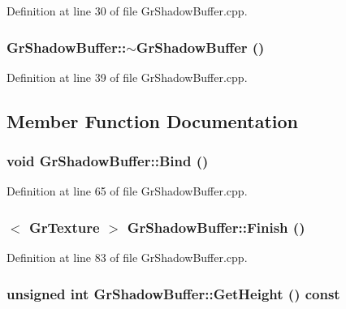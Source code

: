 Definition at line 30 of file GrShadowBuffer.cpp.\hypertarget{class_gr_shadow_buffer_21c7a7e89872ff5d1f3d475d4259c370}{
\subsubsection[{$\sim$GrShadowBuffer}]{\setlength{\rightskip}{0pt plus 5cm}GrShadowBuffer::$\sim$GrShadowBuffer ()}}
\label{class_gr_shadow_buffer_21c7a7e89872ff5d1f3d475d4259c370}




Definition at line 39 of file GrShadowBuffer.cpp.

\subsection{Member Function Documentation}
\hypertarget{class_gr_shadow_buffer_ac80386a135c833c980497559936e98f}{
\subsubsection[{Bind}]{\setlength{\rightskip}{0pt plus 5cm}void GrShadowBuffer::Bind ()}}
\label{class_gr_shadow_buffer_ac80386a135c833c980497559936e98f}




Definition at line 65 of file GrShadowBuffer.cpp.\hypertarget{class_gr_shadow_buffer_248dc6ca6068c376661cb45a02205e89}{
\subsubsection[{Finish}]{$<$ {\bf GrTexture} $>$ GrShadowBuffer::Finish ()}}
\label{class_gr_shadow_buffer_248dc6ca6068c376661cb45a02205e89}




Definition at line 83 of file GrShadowBuffer.cpp.\hypertarget{class_gr_shadow_buffer_09532b8365c6f1ac03811306fddccba5}{
\subsubsection[{GetHeight}]{\setlength{\rightskip}{0pt plus 5cm}unsigned int GrShadowBuffer::GetHeight () const}}
\label{class_gr_shadow_buffer_09532b8365c6f1ac03811306fddccba5}





